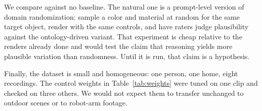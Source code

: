 We compare against no baseline. The natural one is a prompt-level version of domain randomization: sample a color and material at random for the same target object, render with the same controls, and have raters judge plausibility against the ontology-driven variant. That experiment is cheap relative to the renders already done and would test the claim that reasoning yields more plausible variation than randomness. Until it is run, that claim is a hypothesis.

Finally, the dataset is small and homogeneous: one person, one home, eight recordings. The control weights in Table~\ref{tab:weights} were tuned on one clip and checked on three others. We would not expect them to transfer unchanged to outdoor scenes or to robot-arm footage.
